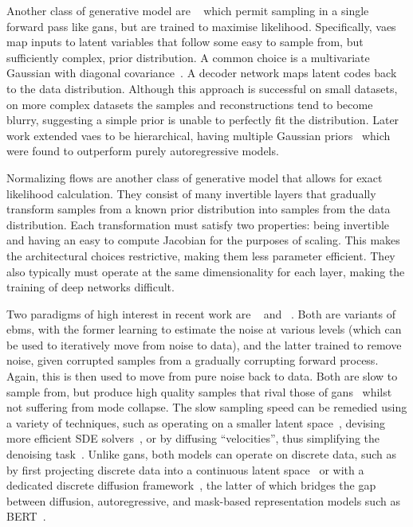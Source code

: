 Another class of generative model are ~\cite{kingma2013vae} which
permit sampling in a single forward pass like \glspl{gan}, but are trained to
maximise likelihood. Specifically, \glspl{vae} map inputs to latent variables
that follow some easy to sample from, but sufficiently complex, prior
distribution. A common choice is a multivariate Gaussian with diagonal
covariance~\cite{kingma2013vae}. A decoder network maps latent codes back
to the data distribution. Although this approach is successful on small
datasets, on more complex datasets the samples and reconstructions tend to
become blurry, suggesting a simple prior is unable to perfectly fit the
distribution. Later work extended \glspl{vae} to be hierarchical, having
multiple Gaussian priors~\cite{arash2020nvae,child2020vqvae} which were found to
outperform purely autoregressive models.

Normalizing flows are another class of generative model that allows for exact
likelihood calculation. They consist of many invertible layers that gradually
transform samples from a known prior distribution into samples from the data
distribution. Each transformation must satisfy two properties: being invertible
and having an easy to compute Jacobian for the purposes of scaling. This makes
the architectural choices restrictive, making them less parameter efficient.
They also typically must operate at the same dimensionality for each layer,
making the training of deep networks difficult.

Two paradigms of high interest in recent work are
~\cite{ho2020ddpm,dhariwal2021ddpm} and
~\cite{song2019sbm,song2020sde,song2021mlt,vahdat2021sbmlatent}.
Both are variants of \glspl{ebm}, with the former learning to estimate the noise
at various levels (which can be used to iteratively move from noise to data),
and the latter trained to remove noise, given corrupted samples from a gradually
corrupting forward process. Again, this is then used to move from pure noise
back to data. Both are slow to sample from, but produce high quality samples
that rival those of \glspl{gan}~\cite{dhariwal2021ddpm} whilst not suffering
from mode collapse. The slow sampling speed can be remedied using a variety of
techniques, such as operating on a smaller latent
space~\cite{vahdat2021sbmlatent}, devising more efficient SDE
solvers~\cite{martineau2021fast}, or by diffusing ``velocities'', thus
simplifying the denoising task~\cite{dockhorn2021langevin}. Unlike \glspl{gan},
both models can operate on discrete data, such as by first projecting
discrete data into a continuous latent space~\cite{vahdat2021sbmlatent} or with
a dedicated discrete diffusion framework~\cite{austin2021structured}, the latter
of which bridges the gap between diffusion, autoregressive, and mask-based
representation models such as BERT~\cite{devlin2019bert}.

